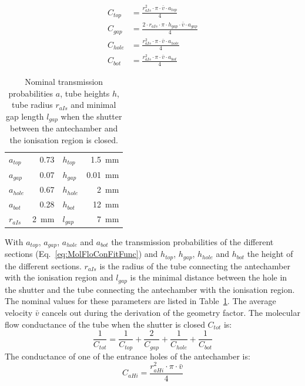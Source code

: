 	\begin{align}
		C_{top}  &= \frac{r_{aIs}^2\cdot\pi\cdot\bar{v}\cdot a_{top}}{4}\\
		C_{gap}  &= \frac{2\cdot r_{aIs}\cdot \pi \cdot h_{gap}\cdot\bar{v}\cdot a_{gap}}{4}\\
		C_{hole} &= \frac{r_{aIs}^2\cdot\pi\cdot\bar{v}\cdot a_{hole}}{4}\\
		C_{bot}  &= \frac{r_{aIs}^2\cdot\pi\cdot\bar{v}\cdot a_{bot}}{4}
	\end{align}
	\begin{table}[H]
		\begin{center}
			\begin{tabular}{|l r| l r| }
				\hline
				$a_{top}$	& 0.73 	& $h_{top}$		& 1.5~mm	\\
				$a_{gap}$	& 0.07 	& $h_{gap}$		& 0.01~mm \\
				$a_{hole}$ 	& 0.67 	& $h_{hole}$ 	& 2~mm\\
				$a_{bot}$ 	& 0.28 	& $h_{bot}$ 	& 12~mm\\
				$r_{aIs}$ 	& 2~mm & $l_{gap}$ 	& 7~mm\\
				\hline
			\end{tabular}
		\end{center}
		\caption{Nominal transmission probabilities $a$, tube heights $h$, tube radius $r_{aIs}$ and minimal gap length $l_{gap}$ when the shutter between the antechamber and the ionisation region is closed.}
		\label{tab:thMolFloConMotClosPara}
	\end{table}
	With $a_{top}$, $a_{gap}$, $a_{hole}$ and $a_{bot}$ the transmission probabilities of the different sections (Eq.~\eqref{eq:MolFloConFitFunc}) and $h_{top}$, $h_{gap}$, $h_{hole}$ and $h_{bot}$ the height of the different sections. $r_{aIs}$ is the radius of the tube connecting the antechamber with the ionisation region and $l_{gap}$ is the minimal distance between the hole in the shutter and the tube connecting the antechamber with the ionisation region. The nominal values for these parameters are listed in Table~\ref{tab:thMolFloConMotClosPara}. The average velocity $\bar{v}$ cancels out during the derivation of the geometry factor. The molecular flow conductance of the tube when the shutter is closed $C_{tot}$ is:
	\begin{equation}
		\frac{1}{C_{tot}} = \frac{1}{C_{top}} + \frac{2}{C_{gap}} + \frac{1}{C_{hole}} + \frac{1}{C_{bot}}
	\end{equation}
	The conductance of one of the entrance holes of the antechamber is:
	\begin{equation}
		C_{aHi} = \frac{r_{aHi}^2\cdot\pi\cdot\bar{v}}{4}
	\end{equation}

